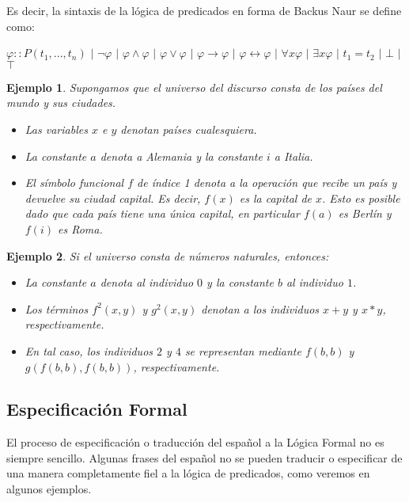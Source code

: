 \documentclass[letterpaper,12pt]{article}
\newtheorem{ejem}{Ejemplo}[]
\begin{document}
    Es decir, la sintaxis de la lógica de predicados en forma de Backus Naur se 
    define como:
    \begin{center}
      $\varphi :: P(t_{1}, ..., t_{n})$ $|$ $\neg \varphi$ $|$ 
      $\varphi \land \varphi$ $|$ $\varphi \lor \varphi$ $|$ 
      $\varphi \rightarrow \varphi$ $|$ $\varphi \leftrightarrow 
      \varphi$ $|$ $\forall x \varphi$ $|$ $\exists x \varphi$ $|$
      $t_{1} = t_{2}$ $|$ $\bot$ $|$ $\top$
    \end{center}

    \begin{ejem}
      Supongamos que el universo del discurso consta de los países del mundo y 
      sus ciudades.
      \begin{itemize}
        \item Las variables $x$ e $y$ denotan países cualesquiera.
        \item La constante $a$ denota a Alemania y la constante $i$ a Italia.
        \item El símbolo funcional $f$ de índice 1 denota a la operación que 
        recibe un país y devuelve su ciudad capital. Es decir, $f(x)$ es la 
        capital de $x$. Esto es posible dado que cada país tiene una única 
        capital, en particular $f(a)$ es Berlín y $f(i)$ es Roma.
      \end{itemize}
    \end{ejem}

    \begin{ejem}
      Si el universo consta de números naturales, entonces:
      \begin{itemize}
        \item La constante $a$ denota al individuo $0$ y la constante $b$ al 
        individuo $1$.
        \item Los términos $f^{2}(x,y)$ y $g^{2}(x,y)$ denotan a los individuos 
        $x + y$ y $x*y$, respectivamente.
        \item En tal caso, los individuos $2$ y $4$ se representan mediante 
        $f(b,b)$ y $g(f(b,b), f(b,b))$, respectivamente.
      \end{itemize}
    \end{ejem}
    
    \subsection{Especificación Formal}
    El proceso de especificación o traducción del español a la Lógica Formal no 
    es siempre sencillo. Algunas frases del español no se pueden traducir o
    especificar de una manera completamente fiel a la lógica de predicados,
    como veremos en algunos ejemplos.
\end{document}
